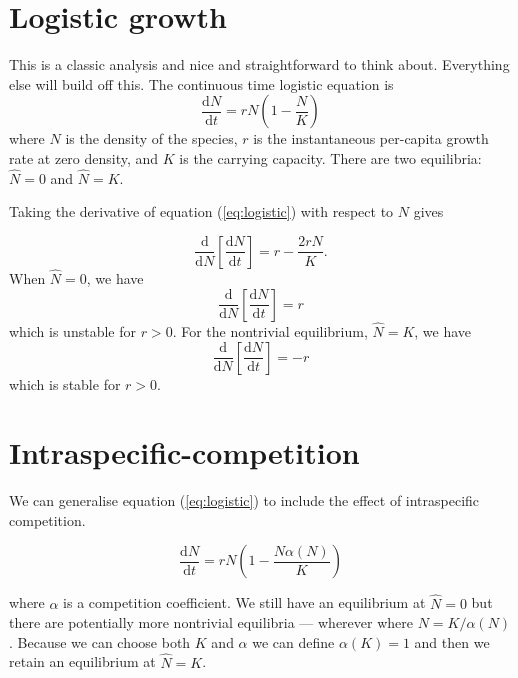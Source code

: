 \documentclass[12pt,a4paper]{article}
\newcommand{\ud}{\mathrm{d}}
\begin{document}
\section{Logistic growth}

This is a classic analysis and nice and straightforward to think
about.  Everything else will build off this.  The continuous time
logistic equation is
%
\begin{equation}
  \label{eq:logistic}
  \frac{\ud N}{\ud t} = r N\left(1 - \frac{N}{K}\right)
\end{equation}
%
where $N$ is the density of the species, $r$ is the instantaneous
per-capita growth rate at zero density, and $K$ is the carrying
capacity.  There are two equilibria: $\hat N = 0$ and $\hat N = K$.

Taking the derivative of equation (\ref{eq:logistic}) with respect to
$N$ gives

\begin{equation}
  \label{eq:logistic-derivative}
  \frac{\ud}{\ud N}\left[\frac{\ud N}{\ud t}\right]
   = r - \frac{2 r N}{K}.
\end{equation}
%
When $\hat N = 0$, we have 
\begin{equation}
  \label{eq:logistic-derivative-trivial}
  \frac{\ud}{\ud N}\left[\frac{\ud N}{\ud t}\right]
   = r
\end{equation}
which is unstable for $r > 0$.  For the nontrivial equilibrium, $\hat
N = K$, we have
\begin{equation}
  \label{eq:logistic-derivative-nontrivial}
  \frac{\ud}{\ud N}\left[\frac{\ud N}{\ud t}\right]
   = -r
\end{equation}
which is stable for $r > 0$.

\section{Intraspecific-competition}

We can generalise equation (\ref{eq:logistic}) to include the effect
of intraspecific competition.  

\begin{equation}
  \label{eq:logistic-competition}
  \frac{\ud N}{\ud t} = r N\left(1 - \frac{N\alpha(N)}{K}\right)
\end{equation}

where $\alpha$ is a competition coefficient.  We still have an
equilibrium at $\hat N = 0$ but there are potentially more nontrivial
equilibria --- wherever where $N = K / \alpha(N)$.  Because we can
choose both $K$ and $\alpha$ we can define $\alpha(K) = 1$ and then we
retain an equilibrium at $\hat N = K$.
\end{document}
